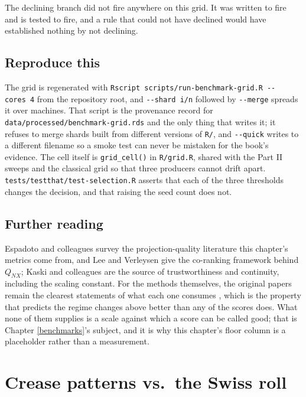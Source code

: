 \documentclass[
  british,
  a4paper,
]{book}
\newcounter{none} %
\begin{document}
The declining branch did not fire anywhere on this grid. It was written to fire
and is tested to fire, and a rule that could not have declined would have
established nothing by not declining.

\section{Reproduce this}\label{results-reproduce}

The grid is regenerated with
\texttt{Rscript\ scripts/run-benchmark-grid.R\ -\/-cores\ 4} from the repository root, and
\texttt{-\/-shard\ i/n} followed by \texttt{-\/-merge} spreads it over machines. That script is the
provenance record for \texttt{data/processed/benchmark-grid.rds} and the only thing
that writes it; it refuses to merge shards built from different versions of
\texttt{R/}, and \texttt{-\/-quick} writes to a different filename so a smoke test can never be
mistaken for the book's evidence. The cell itself is \texttt{grid\_cell()} in
\texttt{R/grid.R}, shared with the Part II sweeps and the classical grid so that three
producers cannot drift apart. \texttt{tests/testthat/test-selection.R} asserts that
each of the three thresholds changes the decision, and that raising the seed
count does not.

\section{Further reading}\label{results-reading}

Espadoto and colleagues \citep{espadoto2021survey} survey the projection-quality
literature this chapter's metrics come from, and Lee and Verleysen
\citep{lee2009quality} give the co-ranking framework behind \(Q_{NX}\); Kaski and
colleagues \citep{kaski2003trustworthiness} are the source of trustworthiness and
continuity, including the scaling constant. For the methods themselves, the
original papers remain the clearest statements of what each one consumes
\citep{tenenbaum2000isomap, roweis2000lle, belkin2003laplacian, coifman2006diffusion, vandermaaten2008tsne, mcinnes2018umap}, which is the
property that predicts the regime changes above better than any of the scores
does. What none of them supplies is a scale against which a score can be called
good; that is Chapter \ref{benchmarks}'s subject, and it is why this chapter's
floor column is a placeholder rather than a measurement.

\chapter{Crease patterns vs.~the Swiss roll}\label{comparison}
\end{document}
